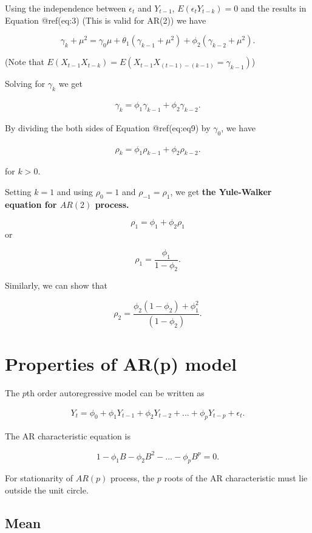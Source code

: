 \documentclass[
  11pt,
  a4paper,
]{report}
\begin{document}
Using the independence between \(\epsilon_t\) and \(Y_{t-1}\),
\(E(\epsilon_t Y_{t-k})=0\) and the results in Equation @ref(eq:3) (This
is valid for AR(2)) we have

\[\gamma_k + \mu^2 = \gamma_0 \mu + \theta_1 (\gamma_{k-1}+\mu^2)+\phi_2 (\gamma_{k-2}+\mu^2).\]

(Note that \(E(X_{t-1}X_{t-k})=E(X_{t-1}X_{(t-1)-(k-1)}=\gamma_{k-1})\))

Solving for \(\gamma_k\) we get

\begin{align}
\label{eq:eq9}
 \gamma_k=\phi_1\gamma_{k-1}+\phi_2\gamma_{k-2}.
\end{align}

By dividing the both sides of Equation @ref(eq:eq9) by \(\gamma_0\), we
have

\begin{align}
\label{eq:yule2}
 \rho_k=\phi_1\rho_{k-1}+\phi_2\rho_{k-2}.
\end{align}

for \(k>0\).

Setting \(k=1\) and using \(\rho_0=1\) and \(\rho_{-1}=\rho_1\), we get
\textbf{the Yule-Walker equation for \(AR(2)\) process.}

\[\rho_1=\phi_1+\phi_2 \rho_1\] or

\[\rho_1 = \frac{\phi_1}{1-\phi_2}.\]

Similarly, we can show that

\[\rho_2 = \frac{\phi_2(1-\phi_2)+\phi_1^2}{(1-\phi_2)}.\]

\section{Properties of AR(p) model}\label{properties-of-arp-model}

The \(p\)th order autoregressive model can be written as

\begin{align}
Y_t = \phi_0 + \phi_1Y_{t-1}+\phi_2 Y_{t-2}+ ... + \phi_p Y_{t-p}+\epsilon_t.
\end{align}

The AR characteristic equation is

\[1-\phi_1B-\phi_2B^2-...-\phi_pB^p=0.\]

For stationarity of \(AR(p)\) process, the \(p\) roots of the AR
characteristic must lie outside the unit circle.

\subsection{Mean}\label{mean-2}
\end{document}
